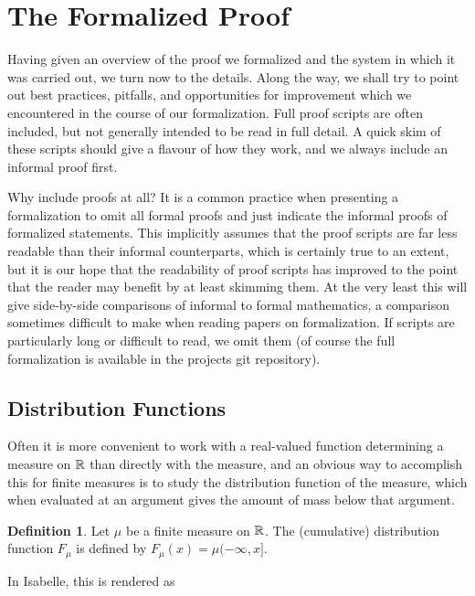 \documentclass{article}
\theoremstyle{definition}
\newtheorem{definition}[theorem]{Definition}
\begin{document}
\section{The Formalized Proof} \label{sec:form}

Having given an overview of the proof we formalized and the system in which it was carried out, we turn now to the details. Along the way, we shall try to point out best practices, pitfalls, and opportunities for improvement which we encountered in the course of our formalization. Full proof scripts are often included, but not generally intended to be read in full detail. A quick skim of these scripts should give a flavour of how they work, and we always include an informal proof first.

Why include proofs at all? It is a common practice when presenting a formalization to omit all formal proofs and just indicate the informal proofs of formalized statements. This implicitly assumes that the proof scripts are far less readable than their informal counterparts, which is certainly true to an extent, but it is our hope that the readability of proof scripts has improved to the point that the reader may benefit by at least skimming them. At the very least this will give side-by-side comparisons of informal to formal mathematics, a comparison sometimes difficult to make when reading papers on formalization. If scripts are particularly long or difficult to read, we omit them (of course the full formalization is available in the projects git repository).

\subsection{Distribution Functions} \label{sec:cdf}

Often it is more convenient to work with a real-valued function determining a measure on $\mathbb{R}$ than directly with the measure, and an obvious way to accomplish this for finite measures is to study the distribution function of the measure, which when evaluated at an argument gives the amount of mass below that argument.

\begin{definition}
Let $\mu$ be a finite measure on $\mathbb{R}$. The (cumulative) distribution function $F_\mu$ is defined by $F_\mu(x) = \mu (-\infty, x]$.
\end{definition}

In Isabelle, this is rendered as

\medskip
\end{document}
